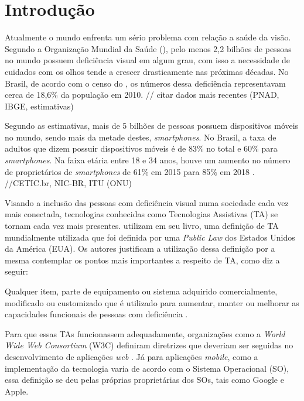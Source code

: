 \chapter{Introdução}

Atualmente o mundo enfrenta um sério problema com relação a saúde da visão. Segundo a Organização Mundial da Saúde (), pelo menos 2,2 bilhões de pessoas no mundo possuem deficiência visual em algum grau, com isso a necessidade de cuidados com os olhos tende a crescer drasticamente nas próximas décadas. No Brasil, de acordo com o censo do , os números dessa deficiência representavam cerca de 18,6\% da população em 2010. // citar dados mais recentes (PNAD, IBGE, estimativas)

Segundo  as estimativas, mais de 5 bilhões de pessoas possuem dispositivos móveis no mundo, sendo mais da metade destes, \textit{smartphones}. No Brasil, a taxa de adultos que dizem possuir dispositivos móveis é de 83\% no total e 60\% para \textit{smartphones}. Na faixa etária entre 18 e 34 anos, houve um aumento no número de proprietários de \textit{smartphones} de 61\% em 2015 para 85\% em 2018 \cite{Taylor2019}. //CETIC.br, NIC-BR, ITU (ONU)

Visando a inclusão das pessoas com deficiência visual numa sociedade cada vez mais conectada, tecnologias conhecidas como Tecnologias Assistivas (TA) se tornam cada vez mais presentes.  utilizam em seu livro, uma definição de TA mundialmente utilizada que foi definida por uma \textit{Public Law} dos Estados Unidos da América (EUA). Os autores justificam a utilização dessa definição por a mesma contemplar os pontos mais importantes a respeito de TA, como diz a seguir:
\begin{citacao}
    Qualquer item, parte de equipamento ou sistema adquirido comercialmente, modificado ou customizado que é utilizado para aumentar, manter ou melhorar as capacidades funcionais de pessoas com deficiência \cite{Cook2014}.
\end{citacao}

Para que essas TAs funcionassem adequadamente, organizações como a \textit{World Wide Web Consortium} (W3C) definiram diretrizes que deveriam ser seguidas no desenvolvimento de aplicações \textit{web} \cite{W3C2019}. Já para aplicações \textit{mobile}, como a implementação da tecnologia varia de acordo com o Sistema Operacional (SO), essa definição se deu pelas próprias proprietárias dos SOs, tais como Google e Apple.

